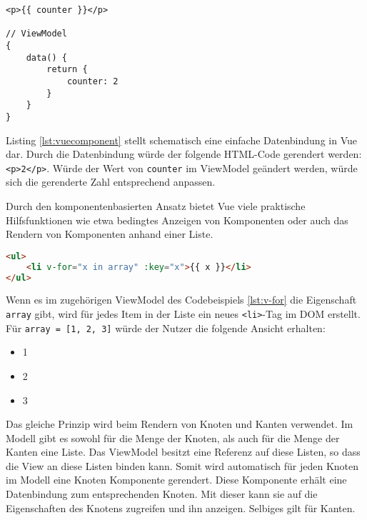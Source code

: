 \bigskip

\begin{lstlisting}[caption=Datenbindung in Vue, label=lst:vuecomponent]
<p>{{ counter }}</p>

// ViewModel
{
    data() {
        return {
            counter: 2
        }
    }
}
\end{lstlisting}

Listing \ref{lst:vuecomponent} stellt schematisch eine einfache Datenbindung in Vue dar. Durch die Datenbindung würde der folgende HTML-Code gerendert werden: \texttt{<p>2</p>}. Würde der Wert von \texttt{counter} im ViewModel geändert werden, würde sich die gerenderte Zahl entsprechend anpassen.

Durch den komponentenbasierten Ansatz bietet Vue viele praktische Hilfsfunktionen wie etwa bedingtes Anzeigen von Komponenten oder auch das Rendern von Komponenten anhand einer Liste.

\begin{lstlisting}[caption=Rendern von Listen in Vue, label=lst:v-for,language=HTML]
<ul>
    <li v-for="x in array" :key="x">{{ x }}</li>
</ul>
\end{lstlisting}

Wenn es im zugehörigen ViewModel des Codebeispiels \ref{lst:v-for} die Eigenschaft \texttt{array} gibt, wird für jedes Item in der Liste ein neues \texttt{<li>}-Tag im \ac{DOM} erstellt. Für \texttt{array = [1, 2, 3]} würde der Nutzer die folgende Ansicht erhalten:
\begin{itemize}
    \item 1
    \item 2
    \item 3
\end{itemize}

Das gleiche Prinzip wird beim Rendern von Knoten und Kanten verwendet. Im Modell gibt es sowohl für die Menge der Knoten, als auch für die Menge der Kanten eine Liste. Das ViewModel besitzt eine Referenz auf diese Listen, so dass die View an diese Listen binden kann. Somit wird automatisch für jeden Knoten im Modell eine Knoten Komponente gerendert. Diese Komponente erhält eine Datenbindung zum entsprechenden Knoten. Mit dieser kann sie auf die Eigenschaften des Knotens zugreifen und ihn anzeigen. Selbiges gilt für Kanten.